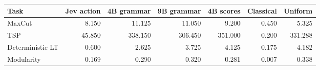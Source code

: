 \begin{tabular}{lrrrrrr}
\toprule
Task & Jev action & 4B grammar & 9B grammar & 4B scores & Classical & Uniform \\
\midrule
MaxCut & 8.150 & 11.125 & 11.050 & 9.200 & 0.450 & 5.325 \\
TSP & 45.850 & 338.150 & 306.450 & 351.000 & 0.200 & 331.288 \\
Deterministic LT & 0.600 & 2.625 & 3.725 & 4.125 & 0.175 & 4.182 \\
Modularity & 0.169 & 0.290 & 0.320 & 0.281 & 0.007 & 0.338 \\
\bottomrule
\end{tabular}
